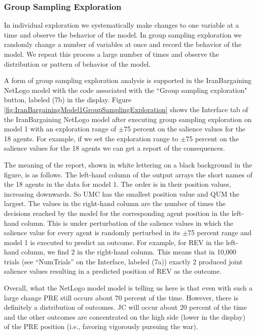 \subsubsection{Group Sampling Exploration}

In individual exploration we systematically make changes to one variable at a time and observe the behavior of the model. In group sampling exploration we randomly change a number of variables at once and record the behavior of the model. We repeat this process a large number of times and observe the distribution or pattern of behavior of the model.

A form of group sampling exploration analysis is supported in the IranBargaining NetLogo model 
with the code associated with the ``Group sampling exploration" button, labeled (7b) in the display. Figure \ref{fig:IranBargainingModel1GroupSamplingExploration} shows the Interface tab of the IranBargaining NetLogo model after executing group sampling exploration on model 1 with an exploration range of $\pm$75 percent on the salience values for the 18 agents. 
For example, if we set the exploration range to $\pm$75 percent on the salience values for the 18 agents we can get a report of the consequences.

The meaning of the report, shown in white lettering on a black background in the figure, 
is as follows. The left-hand column of the output arrays the short names of the 18 agents in the data for model 1. The order is in their position values, increasing downwards. So UMC has the smallest position value and QUM the largest. The values in the right-hand column are the number of times the decisions reached by the model for the corresponding agent position in the left-hand column. This is under perturbation of the salience values in which the salience value for every agent is randomly perturbed in its $\pm$75 percent range and model 1 is executed to predict an outcome.   For example, for REV in the left-hand column, we find 2 in the right-hand column. This means that in 10,000 trials (see ``NumTrials'' on the Interface, labeled (7a)) exactly 2 produced joint salience values resulting in a predicted position of REV as the outcome.

Overall, what the NetLogo model model is telling us here is that even with such a large change PRE still occurs about 70 percent of the time. However, there is definitely a distribution of outcomes.  JC will occur about 20 percent of the time and the other outcomes are concentrated  on the high side (lower in the display) of the PRE position (i.e., favoring vigorously pursuing the war).

